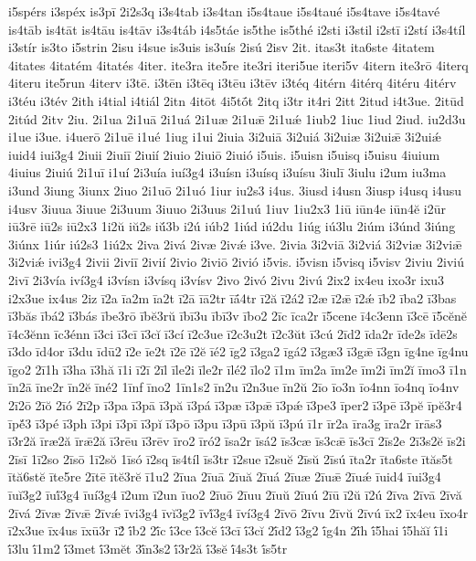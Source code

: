 {i5spérs
i3spéx
is3pī
2i2s3q
i3s4tab
i3s4tan
i5s4taue
i5s4taué
i5s4tave
i5s4tavé
is4tāb
is4tāt
is4tāu
is4tāv
i3s4táb
i4s5táe
is5the
is5thé
i2sti
i3stil
i2stī
i2stí
i3s4tíl
i3stír
is3to
i5strin
2isu
i4sue
is3uis
is3uís
2isú
2isv
2it.
itas3t
ita6ste
4itatem
4itates
4itatém
4itatés
4iter.
ite3ra
ite5re
ite3ri
iteri5ue
iteri5v
4itern
ite3rō
4iterq
4iteru
ite5run
4iterv
i3tē.
i3tēn
i3tēq
i3tēu
i3tēv
i3téq
4itérn
4itérq
4itéru
4itérv
i3téu
i3tév
2ith
i4tial
i4tiál
2itn
4itōt
4i5tṓt
2itq
i3tr
it4ri
2itt
2itud
i4t3ue.
2itūd
2itúd
2itv
2iu.
2i1ua
2i1uā
2i1uá
2i1uæ
2i1uǣ
2i1uǽ
1iub2
1iuc
1iud
2iud.
iu2d3u
i1ue
i3ue.
i4uerō
2i1uē
i1ué
1iug
i1ui
2iuia
3i2uiā
3i2uiá
3i2uiæ
3i2uiǣ
3i2uiǽ
iuid4
iui3g4
2iuii
2iuiī
2iuií
2iuio
2iuiō
2iuió
i5uis.
i5uisn
i5uisq
i5uisu
4iuium
4iuius
2iuiú
2i1uī
i1uí
2i3uía
iuí3g4
i3uísn
i3uísq
i3uísu
3iulī
3iulu
i2um
iu3ma
i3und
3iung
3iunx
2iuo
2i1uō
2i1uó
1iur
iu2s3
i4us.
3iusd
i4usn
3iusp
i4usq
i4usu
i4usv
3iuua
3iuue
2i3uum
3iuuo
2i3uus
2i1uú
1iuv
1iu2x3
1iū
iūn4e
iūn4ĕ
i2ūr
iū3rē
iū2s
iū2x3
1i2ŭ
iŭ2s
iŭ́3b
i2ú
iúb2
1iúd
iú2du
1iúg
iú3lu
2iúm
i3únd
3iúng
3iúnx
1iúr
iú2s3
1iú2x
2iva
2ivá
2ivæ
2ivǽ
i3ve.
2ivia
3i2viā
3i2viá
3i2viæ
3i2viǣ
3i2viǽ
ivi3g4
2ivii
2iviī
2ivií
2ivio
2iviō
2ivió
i5vis.
i5visn
i5visq
i5visv
2iviu
2iviú
2ivī
2i3vía
iví3g4
i3vísn
i3vísq
i3vísv
2ivo
2ivó
2ivu
2ivú
2ix2
ix4eu
ixo3r
ixu3
i2x3ue
ix4us
2iz
ī2a
īa2m
īa2t
ī2ā
īā2tr
īā́4tr
ī2ă
ī2á2
ī2æ
ī2ǣ
ī2ǽ
īb2
ība2
ī3bas
ī3băs
ībá2
ī3bás
ībe3rō
ībĕ3rŭ
ībī3u
ībī3v
ībo2
2īc
īca2r
ī5cene
ī4c3enn
ī3cē
ī5cĕnĕ
ī4c3ĕnn
īc3énn
ī3ci
ī3cī
ī3cĭ
ī3cí
ī2c3ue
ī2c3u2t
ī2c3ŭt
ī3cú
2īd2
īda2r
īde2s
īdē2s
ī3do
īd4or
ī3du
īdū2
ī2e
īe2t
ī2ē
ī2ĕ
īé2
īg2
ī3ga2
īgá2
ī3gæ3
ī3gǣ
ī3gn
īg4ne
īg4nu
īgo2
2ī1h
ī3ha
ī3hă
ī1i
ī2ī
2īl
īle2i
īle2r
īlé2
īlo2
ī1m
īm2a
īm2e
īm2i
īm2ĭ
īmo3
ī1n
īn2ā
īne2r
īn2ĕ
īné2
1īnf
īno2
1īn1s2
īn2u
ī2n3ue
īn2ŭ
2īo
īo3n
īo4nn
īo4nq
īo4nv
2ī2ō
2īŏ
2īó
2ī2p
ī3pa
ī3pā
ī3pă
ī3pá
ī3pæ
ī3pǣ
ī3pǽ
ī3pe3
īper2
ī3pē
ī3pĕ
īpĕ3r4
īpĕ́3
ī3pé
ī3ph
ī3pi
ī3pī
ī3pĭ
ī3pō
ī3pu
ī3pū
ī3pŭ
ī3pú
ī1r
īr2a
īra3g
īra2r
īrās3
ī3r2ă
īræ2ă
īrǣ2ă
ī3rēu
ī3rēv
īro2
īró2
īsa2r
īsá2
īs3cæ
īs3cǣ
īs3cī
2īs2e
2ī3s2ĕ
īs2i
2īsī
1ī2so
2īsō
1ī2sŏ
1īsó
ī2sq
īs4tíl
īs3tr
ī2sue
ī2suĕ
2īsŭ
2īsú
īta2r
īta6ste
ītăs5t
ītă6stĕ
īte5re
2ītē
ītĕ3rĕ
ī1u2
2īua
2īuā
2īuă
2īuá
2īuæ
2īuǣ
2īuǽ
īuid4
īui3g4
īuĭ3g2
īuĭ́3g4
īuí3g4
ī2um
ī2un
īuo2
2īuō
2īuu
2īuŭ
2īuú
2īū
ī2ŭ
ī2ú
2īva
2īvā
2īvă
2īvá
2īvæ
2īvǣ
2īvǽ
īvi3g4
īvĭ3g2
īvĭ́3g4
īví3g4
2īvō
2īvu
2īvŭ
2īvú
īx2
īx4eu
īxo4r
ī2x3ue
īx4us
īxū3r
ī2́
ī́b2
2ī́c
ī́3ce
ī́3cĕ
ī́3cī
ī́3cĭ
2ī́d2
ī́3g2
ī́g4n
2ī́h
ī́5hai
ī́5hăĭ
ī́1i
ī́3lu
ī́1m2
ī́3met
ī́3mĕt
3ī́n3s2
ī́3r2ă
ī́3sĕ
ī́4s3t
ī́s5tr
}
